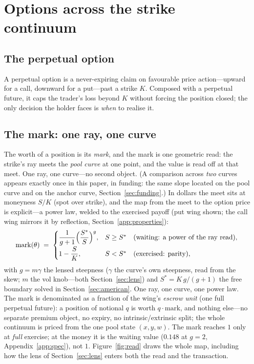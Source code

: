 \documentclass[runningheads]{llncs}
\begin{document}
\section{Options across the strike continuum}\label{sec:continuum}

\subsection{The perpetual option}
A perpetual option is a never-expiring claim on favourable price action---upward
for a call, downward for a put---past a strike $K$. Composed with a perpetual
future, it caps the trader's loss beyond $K$ without forcing the position closed;
the only decision the holder faces is \emph{when} to realise it.

\subsection{The mark: one ray, one curve}
The worth of a position is its \emph{mark}, and the mark is one geometric
read: the strike's ray meets the \emph{pool curve} at one point, and the value
is read off at that meet. One ray, one curve---no second object. (A comparison
across \emph{two} curves appears exactly once in this paper, in funding:
the same slope located on the pool curve and on the anchor curve,
Section~\ref{sec:funding}.) In dollars the meet sits at moneyness $S/K$ (spot
over strike), and the map from the meet to the option price is explicit---a
power law, welded to the exercised payoff (put wing shown; the call wing
mirrors it by reflection, Section~\ref{app:properties}):
\begin{equation}
  \mathrm{mark}(\theta)\;=\;
  \begin{cases}
    \dfrac{1}{g+1}\Bigl(\dfrac{S^{\ast}}{S}\Bigr)^{g}, & S\ge S^{\ast}
      \quad\text{(waiting: a power of the ray read)},\\[6pt]
    1-\dfrac{S}{K}, & S<S^{\ast}\quad\text{(exercised: parity)},
  \end{cases}
  \label{eq:mark}
\end{equation}
with $g=m\gamma$ the lensed steepness ($\gamma$ the curve's own steepness,
read from the skew; $m$ the vol knob---both Section~\ref{sec:lens}) and
$S^{\ast}=K\,g/(g+1)$ the free boundary solved in
Section~\ref{sec:american}. One ray, one curve, one power law. The mark is
denominated as a fraction of the wing's \emph{escrow unit} (one full perpetual
future): a position of notional $q$ is worth $q\cdot\mathrm{mark}$, and
nothing else---no separate premium object, no expiry, no intrinsic/extrinsic
split; the whole continuum is priced from the one pool state $(x,y,w)$. The
mark reaches $1$ only at \emph{full} exercise; at the money it is the waiting
value ($0.148$ at $g=2$, Appendix~\ref{app:spec}), not $1$.
Figure~\ref{fig:read} draws the whole map, including how the lens of
Section~\ref{sec:lens} enters both the read and the transaction.
\end{document}
